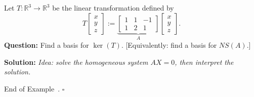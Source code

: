 \documentclass[10pt]{article}
\theoremstyle{definition}
\newtheorem{example}[theorem]{Example}
\renewenvironment{example}
{\begin{oldexample}}
  {\par\smallskip\hfill   End of Example~\theexample. $\square$    \par\end{oldexample}}
\newcommand{\Fl}[1]{\vspace{5mm}\noindent\textbf{#1}}%
\newcommand{\R}{\mathbb{R}}           %
\begin{document}
\begin{example}
  Let $T: \R^{3}\to \R^{3}$ be the linear transformation defined by
  \begin{equation*}
    T
    \begin{bmatrix}
      x\\y\\z
    \end{bmatrix}
    :=
    \underbrace{\begin{bmatrix}
      1&1&-1\\
      1&2&1
    \end{bmatrix}}_{A}
    \begin{bmatrix}
      x\\y\\z
    \end{bmatrix}.
  \end{equation*}
  \Fl{Question:} Find a basis for $\ker(T)$. [Equivalently: find a basis for $NS(A)$.]

  \Fl{Solution:} \textit{Idea: solve the homogeneous system $AX=0$, then
    interpret the solution.}


\end{example}
\end{document}
